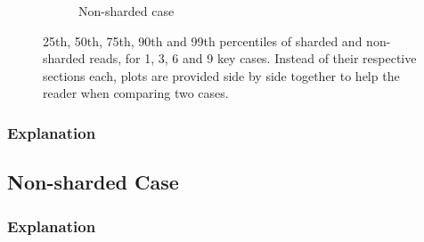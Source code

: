 \documentclass[11pt,a4paper]{article}
\begin{document}
\begin{figure}[h]
\begin{subfigure}{.5\textwidth}
  \caption{Non-sharded case}
  \label{fig:gmg-perc-false}
\end{subfigure}
\caption{25th, 50th, 75th, 90th and 99th percentiles of sharded and non-sharded reads, for 1, 3, 6 and 9 key cases. Instead of their respective sections each, plots are provided side by side together to help the reader when comparing two cases.}
\label{fig:gmg-perc}
\end{figure}

\subsubsection{Explanation} \label{sec:gmg-true-exp}

\subsection{Non-sharded Case} \label{sec:gmg-false}

\subsubsection{Explanation} \label{sec:gmg-false-exp}
\end{document}
